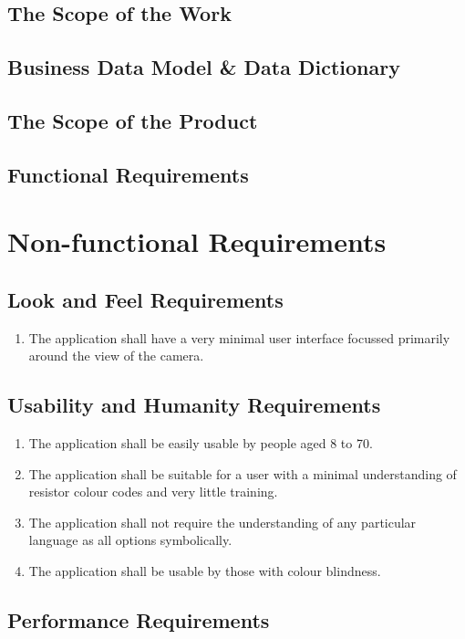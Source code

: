 \documentclass{article}
\begin{document}
\subsection{The Scope of the Work}
\subsection{Business Data Model \& Data Dictionary}
\subsection{The Scope of the Product}
\subsection{Functional Requirements}


\section{Non-functional Requirements}

\subsection{Look and Feel Requirements }
\begin{enumerate}
\item The application shall have a very minimal user interface focussed primarily around the view of the camera.
\end{enumerate}
\subsection{Usability and Humanity Requirements}
\begin{enumerate}
\item The application shall be easily usable by people aged 8 to 70.
\item The application shall be suitable for a user with a minimal understanding of resistor colour codes and very little training.
\item The application shall not require the understanding of any particular language as all options symbolically.
\item The application shall be usable by those with colour blindness.
\end{enumerate}
\subsection{Performance Requirements}
\end{document}
